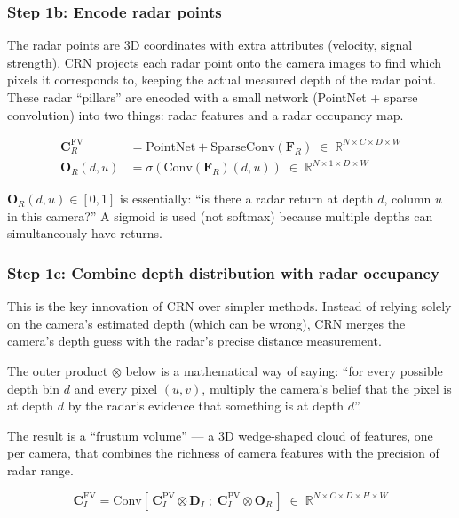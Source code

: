 \documentclass[12pt, a4paper]{article}
\newcommand{\pv}{\mathrm{PV}}
\newcommand{\fv}{\mathrm{FV}}
\newcommand{\DI}{\mathbf{D}_{I}}
\newcommand{\CI}{\mathbf{C}_{I}}
\newcommand{\CR}{\mathbf{C}_{R}}
\newcommand{\OR}{\mathbf{O}_{R}}
\newcommand{\R}{\mathbb{R}}
\theoremstyle{definition}
\begin{document}
\subsubsection{Step 1b: Encode radar points}

\begin{plainbox}
The radar points are 3D coordinates with extra attributes (velocity, signal strength).
CRN projects each radar point onto the camera images to find which pixels it
corresponds to, keeping the actual measured depth of the radar point.
These radar ``pillars'' are encoded with a small network (PointNet + sparse convolution)
into two things: radar features and a radar occupancy map.
\end{plainbox}

\begin{align}
  \CR^\fv &= \mathrm{PointNet{+}SparseConv}(\mathbf{F}_R)
              \;\in\; \R^{N\times C\times D\times W} \\
  \OR(d,u) &= \sigma\!\left(\mathrm{Conv}(\mathbf{F}_R)(d,u)\right)
              \;\in\; \R^{N\times 1\times D\times W}
\end{align}

$\OR(d,u) \in [0,1]$ is essentially: ``is there a radar return at depth $d$,
column $u$ in this camera?'' A sigmoid is used (not softmax) because multiple
depths can simultaneously have returns.

\subsubsection{Step 1c: Combine depth distribution with radar occupancy}

\begin{plainbox}
This is the key innovation of CRN over simpler methods.
Instead of relying solely on the camera's estimated depth (which can be wrong),
CRN merges the camera's depth guess with the radar's precise distance measurement.

The outer product $\otimes$ below is a mathematical way of saying:
``for every possible depth bin $d$ and every pixel $(u,v)$,
multiply the camera's belief that the pixel is at depth $d$
by the radar's evidence that something is at depth $d$''.

The result is a ``frustum volume'' --- a 3D wedge-shaped cloud of features,
one per camera, that combines the richness of camera features with the
precision of radar range.
\end{plainbox}

\begin{equation}
  \CI^\fv
  = \mathrm{Conv}\!\left[\,\CI^\pv \otimes \DI\;;\;\CI^\pv \otimes \OR\,\right]
  \;\in\; \R^{N\times C\times D\times H\times W}
  \label{eq:rvt_lift}
\end{equation}
\end{document}
